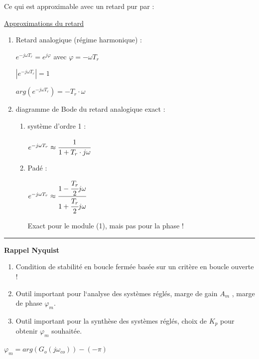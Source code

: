 \documentclass[	DIV=calc,%
							paper=a4,%
							fontsize=11pt,%
							twocolumn]{scrartcl} %
\newcommand{\hformbar}[1]{\bigskip\hrule\vspace{5pt}} %
\newcounter{mycounter}
\newcommand{\formdesc}[1]{\noindent\textbf{#1} \addtocounter{mycounter}{1} \hfill \themycounter}
\begin{document}
\vspace{3mm}

Ce qui est approximable avec un retard pur par : 

\vspace{3mm}

\underline{Approximations du retard}

\begin{enumerate}
    \item Retard analogique (régime harmonique) :
    
        $e^{-j \omega T_r} = e^{j\varphi}$ avec $\varphi = - \omega T_r$

        $|e^{-j\omega T_r}| = 1$

        $arg(e^{-j\omega T_r}) = -T_r \cdot \omega$

    \item diagramme de Bode du retard analogique exact : 
        \begin{enumerate}
            \item système d'ordre 1 : 
            
                $e^{-j\omega T_r}  \approx \cfrac{1}{1+T_r\cdot j\omega}$

            \item Padé : 
                
                $e^{-j\omega T_r}  \approx \cfrac{1-\cfrac{T_r}{2}j\omega}{1+\cfrac{T_r}{2}j\omega}$

            Exact pour le module (1), mais pas pour la phase !

        \end{enumerate}
\end{enumerate}
\hformbar

\newpage

\formdesc{Rappel Nyquist}

\begin{enumerate}
    \item Condition de stabilité en boucle fermée basée sur un critère en boucle ouverte !
    \item Outil important pour l‘analyse des systèmes réglés, marge de gain $A_m$ , marge de phase $\varphi_m$.
    \item Outil important pour la synthèse des systèmes réglés, choix de $K_p$ pour obtenir $\varphi_m$ souhaitée.
\end{enumerate}

$\varphi_m = arg(G_o(j\omega_{co}))- (-\pi)$ \quad [rad]

\vspace{3mm}
\end{document}
